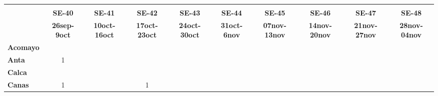 \begin{tabular}{lccccccccc}
	\textbf{}              & \multicolumn{1}{l}{}                        & \multicolumn{1}{l}{}      & \multicolumn{1}{l}{}                         & \multicolumn{1}{l}{}                         & \multicolumn{1}{l}{}                         & \multicolumn{1}{l}{}                        & \multicolumn{1}{l}{}                         & \multicolumn{1}{l}{}                         & \multicolumn{1}{l}{}     \\
	\textbf{}                                                               
    &\textbf{SE-40}                   
	&\textbf{SE-41}                              &\textbf{SE-42}                   &\textbf{SE-43}                  
	&\textbf{SE-44} 
	&\textbf{SE-45} 							&\textbf{SE-46} 
	&\textbf{SE-47}								&\textbf{SE-48}  \\
	\textbf{}             
  	&\textbf{26sep-9oct}  						&\textbf{10oct-16oct} 
	&\textbf{17oct-23oct} 						&\textbf{24oct-30oct} 		       &\textbf{31oct-6nov}  						&\textbf{07nov-13nov} 
	&\textbf{14nov-20nov} 						&\textbf{21nov-27nov} 	  		&\textbf{28nov-04nov} 	\\
	\textbf{Acomayo}                        	
	&\cellcolor[HTML]{FCC46C}     	    		&\cellcolor[HTML]{FCC46C}                   &\cellcolor[HTML]{FCC46C}          			&\cellcolor[HTML]{FCC46C}                  
	&\cellcolor[HTML]{FCC46C}  			        &\cellcolor[HTML]{FCC46C}          &\cellcolor[HTML]{FCC46C} 					&\cellcolor[HTML]{FCC46C} 	    &\cellcolor[HTML]{FCC46C}\\
	\textbf{Anta}                                                                    
	&1                   					
	& \cellcolor[HTML]{FCC46C}                  &\cellcolor[HTML]{FCC46C}         &\cellcolor[HTML]{FCC46C} 			    
	& \cellcolor[HTML]{FCC46C} 				    &\cellcolor[HTML]{FCC46C}		  &\cellcolor[HTML]{FCC46C}					&\cellcolor[HTML]{FCC46C}					&\cellcolor[HTML]{FCC46C}\\
	\textbf{Calca}      				       
	&\cellcolor[HTML]{FCC46C}         			&\cellcolor[HTML]{FCC46C}       
	&\cellcolor[HTML]{FCC46C}                   &\cellcolor[HTML]{FCC46C}         &\cellcolor[HTML]{FCC46C}                
	&\cellcolor[HTML]{FCC46C}                   &\cellcolor[HTML]{FCC46C}  		  &\cellcolor[HTML]{FCC46C} 					&\cellcolor[HTML]{FCC46C} 		   \\                										
	\textbf{Canas}                              
	&1                   						&\cellcolor[HTML]{FCC46C}         &1        			              &\cellcolor[HTML]{FCC46C}                   &\cellcolor[HTML]{FCC46C} 					&\cellcolor[HTML]{FCC46C}         			&\cellcolor[HTML]{FCC46C} 

\end{tabular}
